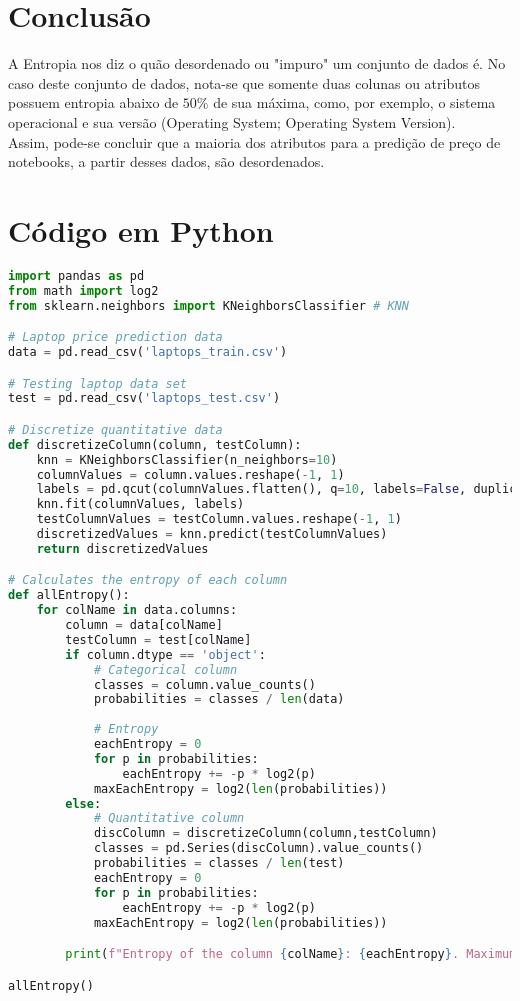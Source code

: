 \documentclass{report}
\begin{document}
\newpage
\section{Conclusão}
A Entropia nos diz o quão desordenado ou "impuro" um conjunto de dados é. 
No caso deste conjunto de dados, nota-se que somente duas colunas ou atributos possuem entropia abaixo de $50\%$ de sua máxima, como, por exemplo, o sistema operacional e sua versão (Operating System; Operating System Version). \\
Assim, pode-se concluir que a maioria dos atributos para a predição de preço de notebooks, a partir desses dados, são desordenados.

\section{Código em Python}

\begin{lstlisting}[language=Python, caption=Código em Python da Entropia]
import pandas as pd
from math import log2
from sklearn.neighbors import KNeighborsClassifier # KNN

# Laptop price prediction data
data = pd.read_csv('laptops_train.csv')

# Testing laptop data set
test = pd.read_csv('laptops_test.csv')

# Discretize quantitative data
def discretizeColumn(column, testColumn):
    knn = KNeighborsClassifier(n_neighbors=10)
    columnValues = column.values.reshape(-1, 1)
    labels = pd.qcut(columnValues.flatten(), q=10, labels=False, duplicates='drop')
    knn.fit(columnValues, labels)
    testColumnValues = testColumn.values.reshape(-1, 1)
    discretizedValues = knn.predict(testColumnValues)
    return discretizedValues

# Calculates the entropy of each column
def allEntropy():
    for colName in data.columns:
        column = data[colName]
        testColumn = test[colName]
        if column.dtype == 'object':
            # Categorical column
            classes = column.value_counts()
            probabilities = classes / len(data)
            
            # Entropy
            eachEntropy = 0
            for p in probabilities:
                eachEntropy += -p * log2(p)
            maxEachEntropy = log2(len(probabilities))
        else:
            # Quantitative column
            discColumn = discretizeColumn(column,testColumn)
            classes = pd.Series(discColumn).value_counts()
            probabilities = classes / len(test)
            eachEntropy = 0
            for p in probabilities:
                eachEntropy += -p * log2(p)
            maxEachEntropy = log2(len(probabilities))

        print(f"Entropy of the column {colName}: {eachEntropy}. Maximum: {maxEachEntropy}")

allEntropy()
\end{lstlisting}
\end{document}
